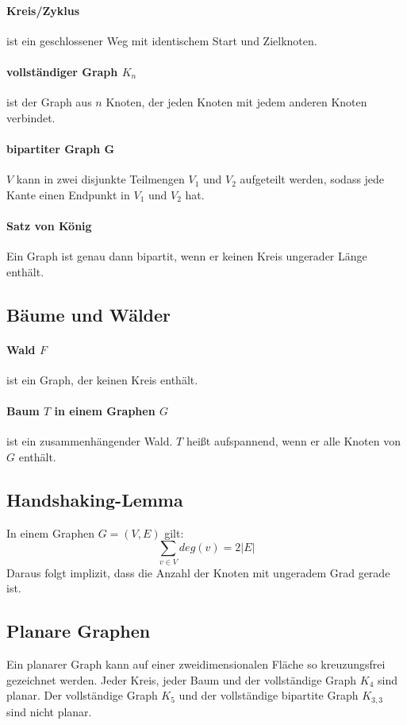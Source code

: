 \documentclass[10pt,a4paper,landscape]{article}
\begin{document}
\begin{multicols*}{3}
            \paragraph*{ Kreis/Zyklus } ist ein geschlossener Weg mit identischem Start und Zielknoten.

            \paragraph*{ vollständiger Graph $K_{n}$ } ist der Graph aus $n$ Knoten, der jeden Knoten mit jedem anderen Knoten verbindet.
            \paragraph*{ bipartiter Graph G } $V$ kann in zwei disjunkte Teilmengen $V_1$ und $V_2$ aufgeteilt werden, sodass jede Kante einen 
            Endpunkt in $V_1$ und $V_2$ hat.
            \paragraph*{ Satz von König }
            Ein Graph ist genau dann bipartit, wenn er keinen Kreis ungerader Länge enthält.

            \subsection{ Bäume und Wälder }
            \paragraph*{ Wald $F$ } ist ein Graph, der keinen Kreis enthält.
            \paragraph*{ Baum $T$ in einem Graphen $G$ } ist ein zusammenhängender Wald. $T$ heißt aufspannend, wenn er alle Knoten von $G$ enthält. 

            \subsection{ Handshaking-Lemma }
            In einem Graphen $G = (V, E)$ gilt:
            \[ \sum_{v\in V} deg(v) = 2|E| \]
            Daraus folgt implizit, dass die Anzahl der Knoten mit ungeradem Grad gerade ist.

            \subsection{ Planare Graphen }
            Ein planarer Graph kann auf einer zweidimensionalen Fläche so kreuzungsfrei gezeichnet werden. Jeder Kreis, 
            jeder Baum und der vollständige Graph $K_4$ sind planar. Der vollständige Graph $K_5$ und der vollständige 
            bipartite Graph $K_{3,3}$ sind nicht planar.

\end{multicols*}
\end{document}

